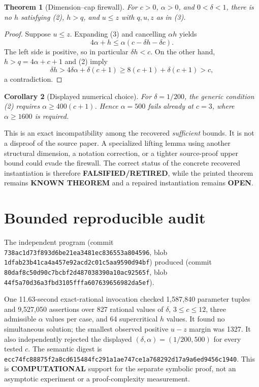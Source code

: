 \documentclass[11pt]{article}
\newtheorem{theorem}{Theorem}
\newtheorem{corollary}[theorem]{Corollary}
\newcommand{\KNOWN}{\textbf{KNOWN THEOREM}}
\newcommand{\COMP}{\textbf{COMPUTATIONAL}}
\newcommand{\OPEN}{\textbf{OPEN}}
\newcommand{\RET}{\textbf{FALSIFIED/RETIRED}}
\begin{document}
\begin{theorem}[Dimension--cap firewall]
For \(c>0\), \(\alpha>0\), and \(0<\delta<1\), there is no \(h\) satisfying
(2), \(h>q\), and \(u\le z\) with \(q,u,z\) as in (3).
\end{theorem}
\begin{proof}
Suppose \(u\le z\).  Expanding (3) and cancelling \(\alpha h\) yields
\[
 4\alpha+h\le \alpha(c-\delta h-\delta c).
\]
The left side is positive, so in particular \(\delta h<c\).  On the other
hand, \(h>q=4\alpha+c+1\) and (2) imply
\[
 \delta h>4\delta\alpha+\delta(c+1)
 \ge 8(c+1)+\delta(c+1)>c,
\]
a contradiction.
\end{proof}

\begin{corollary}[Displayed numerical choice]
For \(\delta=1/200\), the generic condition (2) requires
\(\alpha\ge400(c+1)\).  Hence \(\alpha=500\) fails already at \(c=3\),
where \(\alpha\ge1600\) is required.
\end{corollary}

This is an exact incompatibility among the recovered \emph{sufficient}
bounds.  It is not a disproof of the source paper.  A specialized lifting
lemma using another structural dimension, a notation correction, or a
tighter source-proof upper bound could evade the firewall.  The correct
status of the concrete recovered instantiation is therefore
\RET{}, while the printed theorem remains \KNOWN{} and a repaired
instantiation remains \OPEN{}.

\section{Bounded reproducible audit}
The independent program
(commit \texttt{738ac1d73f893d6be21ea3481ec836553a804596}, blob
\texttt{1dfab23b41ca4a457e92acd2c01c5aa9590d94bf}) produced
(commit \texttt{80daf8c50d90c7bcbf2d487038390a10ac92565f}, blob
\texttt{44f5a70d36a3fbd3105fffa607639656982da5ef}).

One 11.63-second exact-rational invocation checked 1,587,840 parameter tuples
and 9,527,050 assertions over 827 rational values of \(\delta\),
\(3\le c\le12\), three admissible \(\alpha\) values per case, and 64
supercritical \(h\) values.  It found no simultaneous solution; the smallest
observed positive \(u-z\) margin was 1327.  It also independently rejected
the displayed \((\delta,\alpha)=(1/200,500)\) for every tested \(c\).
The semantic digest is
\texttt{ecc74fc88875f2a8cd615484fc291a1ae747ce1a768292d17a9a6ed9456c1940}.
This is \COMP{} support for the separate symbolic proof, not an asymptotic
experiment or a proof-complexity measurement.
\end{document}
